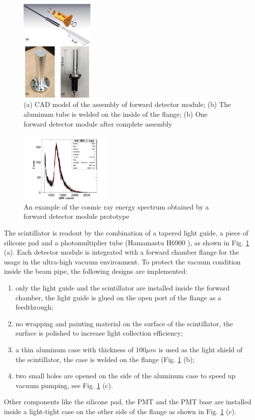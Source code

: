 \documentclass[number,5p]{elsarticle}
\begin{document}
\begin{figure}[htbp]
  \centering
  \includegraphics[width=0.32\textwidth]{./forward_module.png}
  \caption{(a) CAD model of the assembly of forward detector module; (b) The aluminum tube is welded on the inside of the flange; (b) One forward detector module after complete assembly}
  \label{fig:forward_module}
\end{figure}

\begin{figure}[htbp]
  \centering
  \includegraphics[width=0.4\textwidth]{./forward_mip.pdf}
  \caption{An example of the cosmic ray energy spectrum obtained by a forward detector module prototype}
  \label{fig:forward_mip}
\end{figure}

The scintillator is readout by the combination of a tapered light guide, a piece of silicone pad and a
photomultiplier tube (Hamamastu H6900 \cite{hamamatsu}), as shown in Fig. \ref{fig:forward_module} (a).
Each detector module is integrated with a forward chamber flange for the usage
in the ultra-high vacuum environment.
To protect the vacuum condition inside the beam pipe, the following designs are implemented:
\begin{enumerate}
\item only the light guide and the scintillator are installed inside the forward chamber, the light guide is glued on the open port of the flange as a feedthrough;
\item no wrapping and painting material on the surface of the scintillator, the surface is polished to increase light collection efficiency;
\item a thin aluminum case with thickness of \(100 \mu m\) is used as the light shield of the scintillator, the case is welded on the flange (Fig. \ref{fig:forward_module} (b);
\item two small holes are opened on the side of the aluminum case to speed up vacuum pumping, see Fig. \ref{fig:forward_module} (c).
\end{enumerate}
Other components like the silicone pad, the PMT and the PMT base are installed inside a light-tight case on the other side of the flange as shown in Fig. \ref{fig:forward_module} (c).
\end{document}
